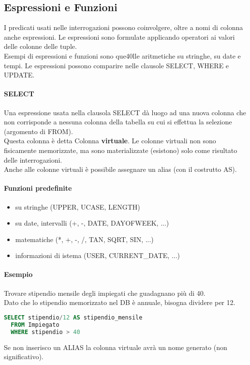 \subsection{Espressioni e Funzioni}
I predicati usati nelle interrogazioni possono coinvolgere, oltre a
nomi di colonna anche espressioni. Le espressioni sono formulate
applicando operatori ai valori delle colonne delle tuple.\\
Esempi di espressioni e funzioni sono que40lle aritmetiche su stringhe,
su date e tempi. Le espressioni possono comparire nelle clausole
SELECT, WHERE e UPDATE.
\paragraph*{SELECT} Una espressione usata nella clausola SELECT
dà luogo ad una nuova colonna che non corrisponde a nessuna colonna
della tabella su cui si effettua la selezione (argomento di FROM).\\
Questa colonna è detta Colonna \textbf{virtuale}. Le colonne virtuali non sono
fisicamente memorizzate, ma sono materializzate (esistono) solo come risultato
delle interrogazioni.\\
Anche alle colonne virtuali è possibile assegnare un alias (con il
costrutto AS).\\
\paragraph*{Funzioni predefinite}
\begin{itemize}
  \item su stringhe (UPPER, UCASE, LENGTH)
  \item su date, intervalli (+, -, DATE, DAYOFWEEK, ...)
  \item matematiche (*, +, -, /, TAN, SQRT, SIN, ...)
  \item informazioni di istema (USER, CURRENT\_DATE, ...) 
\end{itemize}
\paragraph*{Esempio} Trovare stipendio mensile degli impiegati che guadagnano
più di 40.\\
Dato che lo stipendio memorizzato nel DB è annuale, bisogna dividere per 12.
\begin{lstlisting}[language=SQL]
  SELECT stipendio/12 AS stipendio_mensile
  FROM Impiegato
  WHERE stipendio > 40
\end{lstlisting}
Se non inserisco un ALIAS la colonna virtuale avrà un nome generato (non significativo).
